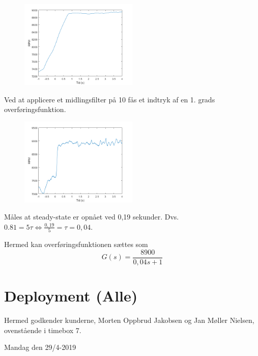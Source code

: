 \begin{figure}[h]
  \centering
  \includegraphics[width=0.5\textwidth]{mo4.png}
  \caption{}
  \label{fig:mo4}
\end{figure}

Ved at applicere et midlingsfilter på 10 fås et indtryk af en 1. grads overføringsfunktion.

\begin{figure}[h]
  \centering
  \includegraphics[width=0.5\textwidth]{mo5.png}
  \caption{}
  \label{fig:mo5}
\end{figure}

Måles at steady-state er opnået ved 0,19 sekunder. Dvs. $0.81 = 5\tau \Leftrightarrow \frac{0,19}{5}=\tau=0,04$.

Hermed kan overføringsfunktionen sættes som
\begin{equation}
  \label{eq:1}
G(s) = \frac{8900}{0,04s+1}  
\end{equation}
\clearpage
\section{Deployment (Alle)}
\label{sec:deployment}

Hermed godkender kunderne, Morten Oppbrud Jakobsen og Jan Møller Nielsen, ovenstående i timebox 7.

Mandag den 29/4-2019

